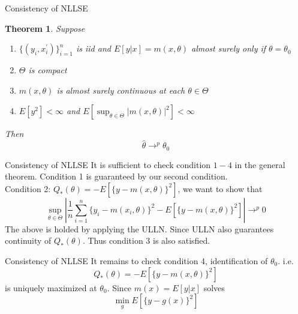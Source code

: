 \documentclass{beamer}
\newtheorem{thm}{Theorem}[subsection]
\begin{document}
\begin{frame}{Consistency of NLLSE}
	\begin{thm}
		Suppose 
		\begin{enumerate}
				\item $\{(y_i,x^{'}_i)\}^n_{i=1}$ is iid and $E[y|x] = m(x,\theta)$ almost surely only if $\theta = \theta_0$
			\item $\Theta$ is compact
			\item $m(x,\theta)$ is almost surely continuous at each $\theta \in \Theta$
			\item $E[y^{2}] < \infty$ and $E[\sup_{\theta \in \Theta} |m(x,\theta)|^{2}] < \infty$
		\end{enumerate}
		Then 
		\[\hat{\theta} \rightarrow^p \theta_0\]
	\end{thm}
\end{frame}

\begin{frame}{Consistency of NLLSE}
	It is sufficient to check condition $1-4$ in the general theorem. Condition 1 is guaranteed by our second condition. \\
	Condition 2: $Q_*(\theta) = - E[\{y - m(x,\theta)\}^2]$, we want to show that 
	\[\sup_{\theta \in \Theta} | \frac{1}{n} \sum^n_{i=1}\{y_i - m(x_i,\theta)\}^2 - E[\{y - m(x,\theta)\}^2]| \rightarrow^p 0\]
	The above is holded by applying the ULLN. Since ULLN also guarantees continuity of $Q_*(\theta)$. Thus condition 3 is also satisfied.
\end{frame}
\begin{frame}{Consistency of NLLSE}
	It remains to check condition 4, identification of $\theta_0$. i.e.
	\[Q_*(\theta) = - E[\{y - m(x,\theta)\}^2]\]
	is uniquely maximized at $\theta_0$. Since $m(x) = E[y|x]$ solves 
	\[\min_g E[\{y - g(x)\}^2]\]
\end{frame}
\end{document}
